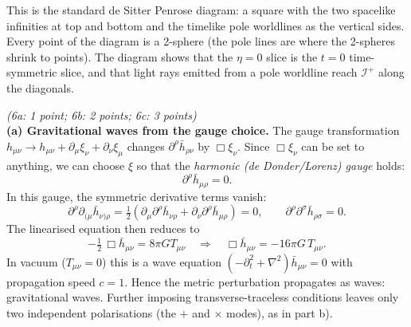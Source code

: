 \documentclass[12pt]{article}
\newcommand{\be}{\begin{equation}}
\newcommand{\ee}{\end{equation}}
\newcommand{\bh}{\bar{h}}
\newcounter{ansno}
\newcommand{\ans}[1]{\vspace{2em}\stepcounter{ansno}
\noindent{\bf Question \theansno.} \emph{(#1)}\\[0.5em]
}
\begin{document}
\begin{center}
\end{center}
This is the standard de Sitter Penrose diagram: a square with the two spacelike infinities at top and bottom and the timelike pole worldlines as the vertical sides. Every point of the diagram is a 2-sphere (the pole lines are where the 2-spheres shrink to points). The diagram shows that the $\eta=0$ slice is the $t=0$ time-symmetric slice, and that light rays emitted from a pole worldline reach $\mathcal{I}^+$ along the diagonals.

\ans{6a: 1 point; 6b: 2 points; 6c: 3 points}
\textbf{(a) Gravitational waves from the gauge choice.} The gauge transformation $h_{\mu\nu}\to h_{\mu\nu}+\partial_\mu\xi_\nu+\partial_\nu\xi_\mu$ changes $\partial^\rho\bh_{\rho\nu}$ by $\Box\xi_\nu$. Since $\Box\xi_\nu$ can be set to anything, we can choose $\xi$ so that the \emph{harmonic (de Donder/Lorenz) gauge} holds:
\be
\partial^\rho \bh_{\mu\rho} = 0.
\ee
In this gauge, the symmetric derivative terms vanish:
\be
\partial^\rho\partial_{(\mu}\bh_{\nu)\rho} = \tfrac12\left(\partial_\mu\partial^\rho\bh_{\nu\rho} + \partial_\nu\partial^\rho\bh_{\mu\rho}\right) = 0,
\qquad
\partial^\rho\partial^\sigma\bh_{\rho\sigma} = 0.
\ee
The linearised equation then reduces to
\be
-\tfrac12\,\Box\bh_{\mu\nu} = 8\pi G T_{\mu\nu}
\quad\Longrightarrow\quad
\Box\bh_{\mu\nu} = -16\pi G\,T_{\mu\nu}.
\ee
In vacuum ($T_{\mu\nu}=0$) this is a wave equation $(-\partial_t^2+\nabla^2)\bh_{\mu\nu}=0$ with propagation speed $c=1$. Hence the metric perturbation propagates as waves: gravitational waves. Further imposing transverse-traceless conditions leaves only two independent polarisations (the $+$ and $\times$ modes), as in part b).
\end{document}
